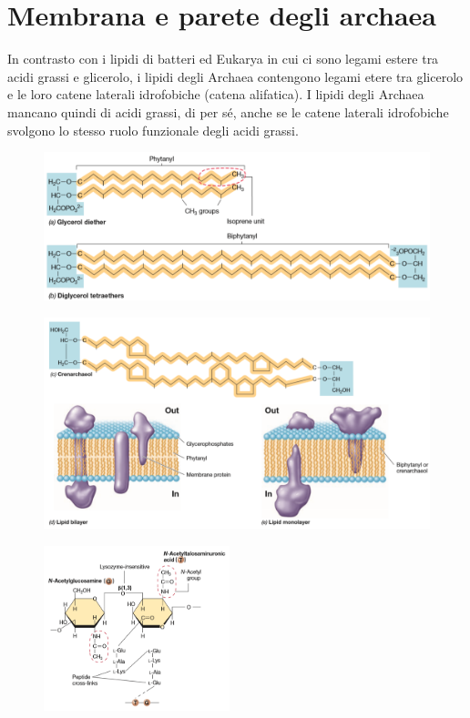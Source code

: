 \section{Membrana e parete degli archaea}
In contrasto con i lipidi di batteri ed Eukarya in cui ci sono legami estere tra acidi grassi e glicerolo, i lipidi degli Archaea contengono legami etere 
tra glicerolo e le loro catene laterali idrofobiche (catena alifatica). I lipidi degli Archaea mancano quindi di acidi grassi, di per sé, anche se le catene 
laterali idrofobiche svolgono lo stesso ruolo funzionale degli acidi grassi. 
\begin{figure}[H]
	\includegraphics[width=\textwidth]{Pictures/11.png}
\end{figure}
\begin{figure}[H]
	\includegraphics[width=\textwidth]{Pictures/12.png}
\end{figure}
\begin{figure}
  \begin{center}
    \includegraphics[width=0.48\textwidth]{Pictures/13.png}
  \end{center}
\end{figure}
